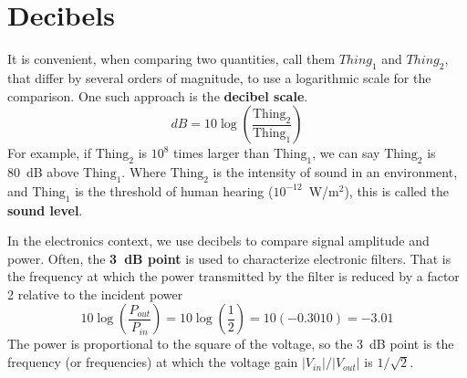 \documentclass[11pt]{article}
\begin{document}
\section{Decibels}
\label{sec:dB}

It is convenient, when comparing two quantities, call them $Thing_1$ 
and $Thing_2$, that differ by several orders of magnitude, to use a
logarithmic scale for the comparison. One such approach is the
\textbf{decibel scale}.
\begin{equation}
  dB = 10 \log \left( \frac{\mathrm{Thing_2}}{\mathrm{Thing_1}} \right)
  \label{eq:db}
\end{equation}
For example, if $\mathrm{Thing_2}$ is $10^8$ times larger than
$\mathrm{Thing_1}$, we can say $\mathrm{Thing_2}$ is 80~dB above
$\mathrm{Thing_1}$. Where $\mathrm{Thing_2}$ is the intensity
of sound in an environment, and $\mathrm{Thing_1}$ is the threshold of
human hearing ($10^{-12}$~W/m$^2$), this is called the
\textbf{sound level}.

In the electronics context, we use decibels to compare signal
amplitude and power. Often, the \textbf{3~dB point} is used to characterize 
electronic filters. That is the frequency at which the power
transmitted by the filter is reduced by a factor 2 relative to the
incident power 
\[
10 \log \left( \frac{P_{out}}{P_{in}} \right)
= 10 \log \left( \frac{1}{2} \right) = 10 (-0.3010) = -3.01
\]
The power is proportional to the square of the voltage, so the 3~dB
point is the frequency (or frequencies) at which the voltage gain
$|V_{in}|/|V_{out}|$ is $1/\sqrt{2}$. 




\end{document}

